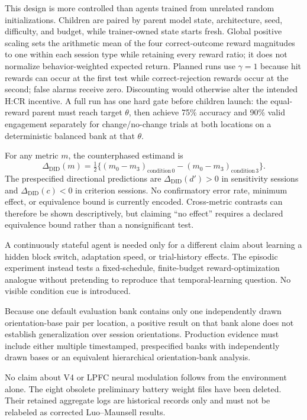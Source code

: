 \documentclass[10pt]{article}
\begin{document}
This design is more controlled than agents trained from unrelated random initializations. Children are paired by parent model state, architecture, seed, difficulty, and budget, while trainer-owned state starts fresh. Global positive scaling sets the arithmetic mean of the four correct-outcome reward magnitudes to one within each session type while retaining every reward ratio; it does not normalize behavior-weighted expected return. Planned runs use $\gamma=1$ because hit rewards can occur at the first test while correct-rejection rewards occur at the second; false alarms receive zero. Discounting would otherwise alter the intended H:CR incentive. A full run has one hard gate before children launch: the equal-reward parent must reach target $\theta$, then achieve 75\% accuracy and 90\% valid engagement separately for change/no-change trials at both locations on a deterministic balanced bank at that $\theta$.

For any metric $m$, the counterphased estimand is
\[
\Delta_{\mathrm{DID}}(m)=\tfrac12\{(m_0-m_3)_{\mathrm{condition\,0}}-(m_0-m_3)_{\mathrm{condition\,3}}\}.
\]
The prespecified directional predictions are $\Delta_{\mathrm{DID}}(d')>0$ in sensitivity sessions and $\Delta_{\mathrm{DID}}(c)<0$ in criterion sessions. No confirmatory error rate, minimum effect, or equivalence bound is currently encoded. Cross-metric contrasts can therefore be shown descriptively, but claiming ``no effect'' requires a declared equivalence bound rather than a nonsignificant test.

A continuously stateful agent is needed only for a different claim about learning a hidden block switch, adaptation speed, or trial-history effects. The episodic experiment instead tests a fixed-schedule, finite-budget reward-optimization analogue without pretending to reproduce that temporal-learning question. No visible condition cue is introduced.

Because one default evaluation bank contains only one independently drawn orientation-base pair per location, a positive result on that bank alone does not establish generalization over session orientations. Production evidence must include either multiple timestamped, prespecified banks with independently drawn bases or an equivalent hierarchical orientation-bank analysis.

No claim about V4 or LPFC neural modulation follows from the environment alone. The eight obsolete preliminary battery weight files have been deleted. Their retained aggregate logs are historical records only and must not be relabeled as corrected Luo--Maunsell results.
\end{document}
